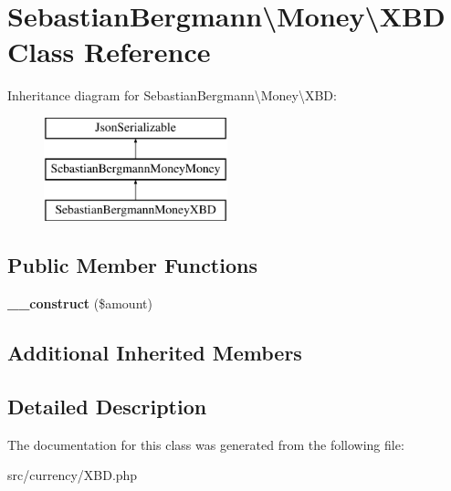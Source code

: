 \hypertarget{classSebastianBergmann_1_1Money_1_1XBD}{}\section{Sebastian\+Bergmann\textbackslash{}Money\textbackslash{}X\+B\+D Class Reference}
\label{classSebastianBergmann_1_1Money_1_1XBD}
Inheritance diagram for Sebastian\+Bergmann\textbackslash{}Money\textbackslash{}X\+B\+D\+:\begin{figure}[H]
\begin{center}
\leavevmode
\includegraphics[height=3.000000cm]{classSebastianBergmann_1_1Money_1_1XBD}
\end{center}
\end{figure}
\subsection*{Public Member Functions}
\begin{DoxyCompactItemize}
\item 
\hypertarget{classSebastianBergmann_1_1Money_1_1XBD_a7a199ab49d2271768658e864892fe671}{}{\bfseries \+\_\+\+\_\+construct} (\$amount)\label{classSebastianBergmann_1_1Money_1_1XBD_a7a199ab49d2271768658e864892fe671}

\end{DoxyCompactItemize}
\subsection*{Additional Inherited Members}


\subsection{Detailed Description}


The documentation for this class was generated from the following file\+:\begin{DoxyCompactItemize}
\item 
src/currency/X\+B\+D.\+php\end{DoxyCompactItemize}
